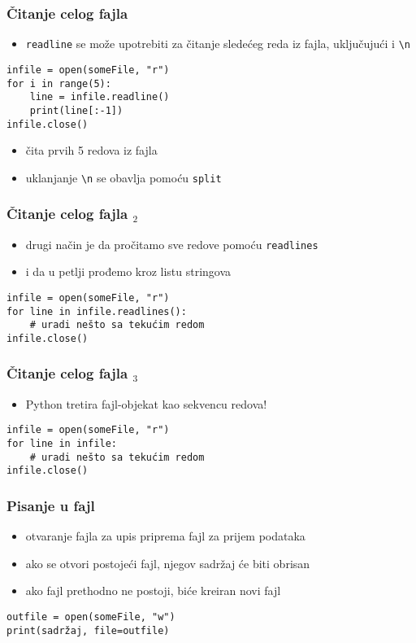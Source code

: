 \documentclass[utf8,compress]{beamer}
\begin{document}
\begin{frame}[fragile]
  \frametitle{Čitanje celog fajla}
  \begin{itemize}
    \item \texttt{readline} se može upotrebiti za čitanje sledećeg reda iz fajla, uključujući i \texttt{\textbackslash n}
  \end{itemize}
\begin{verbatim}
infile = open(someFile, "r")
for i in range(5):
    line = infile.readline()
    print(line[:-1])
infile.close()
\end{verbatim}
  \begin{itemize}
    \item čita prvih 5 redova iz fajla
    \item uklanjanje \texttt{\textbackslash n} se obavlja pomoću \texttt{split}
  \end{itemize}
\end{frame}

\begin{frame}[fragile]
  \frametitle{Čitanje celog fajla $_2$}
  \begin{itemize}
    \item drugi način je da pročitamo sve redove pomoću \texttt{readlines}
    \item i da u petlji prođemo kroz listu stringova
  \end{itemize}
\begin{verbatim}
infile = open(someFile, "r")
for line in infile.readlines():
    # uradi nešto sa tekućim redom
infile.close()
\end{verbatim}
\end{frame}


\begin{frame}[fragile]
  \frametitle{Čitanje celog fajla $_3$}
  \begin{itemize}
    \item Python tretira fajl-objekat kao sekvencu redova!
  \end{itemize}
\begin{verbatim}
infile = open(someFile, "r")
for line in infile:
    # uradi nešto sa tekućim redom
infile.close()
\end{verbatim}
\end{frame}

\begin{frame}[fragile]
  \frametitle{Pisanje u fajl}
  \begin{itemize}
    \item otvaranje fajla za upis priprema fajl za prijem podataka
    \item ako se otvori postojeći fajl, njegov sadržaj će biti obrisan
    \item ako fajl prethodno ne postoji, biće kreiran novi fajl
  \end{itemize}
\begin{verbatim}
outfile = open(someFile, "w")
print(sadržaj, file=outfile)
\end{verbatim}
\end{frame}
\end{document}
